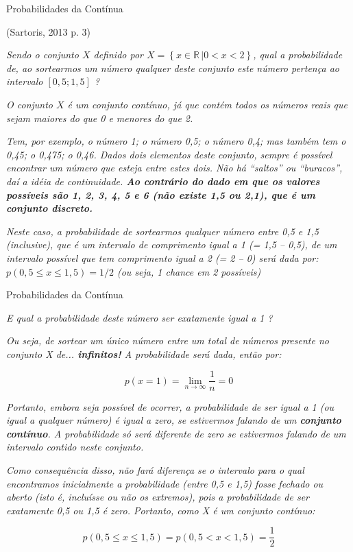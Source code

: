 \documentclass{beamer}
\begin{document}
\begin{frame}{Probabilidades da Contínua}

(Sartoris, 2013 p. 3)~\cite{sartoris}

\vspace{.25cm}
\textit{Sendo o conjunto $X$ definido por $X = \left\{x \in \mathbb{R}\, | 0 < x < 2\right\}$, qual a probabilidade de, ao sortearmos um número qualquer deste conjunto este número pertença ao intervalo $[0,5; 1,5]$ ? }

\footnotesize
\textit{O conjunto $X$ é um conjunto contínuo, já que contém todos os números reais que sejam
maiores do que 0 e menores do que 2. }

\textit{Tem, por exemplo, o número 1; o número 0,5; o número 0,4; mas também tem o 0,45; o 0,475; o 0,46. Dados dois elementos deste conjunto, sempre é possível
encontrar um número que esteja entre estes dois. Não há “saltos” ou “buracos”, daí a idéia de
continuidade. \textbf{Ao contrário do dado em que os valores possíveis são 1, 2, 3, 4, 5 e 6 (não existe 1,5
ou 2,1), que é um conjunto discreto.}}

\textit{Neste caso, a probabilidade de sortearmos qualquer número entre 0,5 e 1,5 (inclusive), que é
um intervalo de comprimento igual a 1 (= 1,5 – 0,5), de um intervalo possível que tem comprimento
igual a 2 (= 2 – 0) será dada por: $p(0,5\leq x \leq 1,5)=1/2$ (ou seja, 1 chance em 2 possíveis)}

\end{frame}



\begin{frame}{Probabilidades da Contínua}

\footnotesize
\textit{E qual a probabilidade deste número ser exatamente igual a 1 ? }

\textit{Ou seja, de sortear um único número entre um total de números presente no conjunto X de... \textbf{infinitos!} A probabilidade será dada, então por:}

$$
p(x=1)=\lim_{n\to\infty}\frac{1}{n}=0
$$

\textit{Portanto, embora seja possível de ocorrer, a probabilidade de ser igual a 1 (ou igual a
qualquer número) é igual a zero, se estivermos falando de um \textbf{conjunto contínuo}. A probabilidade
só será diferente de zero se estivermos falando de um intervalo contido neste conjunto.}

\textit{Como consequência disso, não fará diferença se o intervalo para o qual encontramos
inicialmente a probabilidade (entre 0,5 e 1,5) fosse fechado ou aberto (isto é, incluísse ou não os
extremos), pois a probabilidade de ser exatamente 0,5 ou 1,5 é zero. Portanto, como X é um
conjunto contínuo:}

$$
p(0,5 \leq x \leq 1,5) = p(0,5 < x < 1,5) =\frac{1}{2}
$$
\end{frame}
\end{document}
